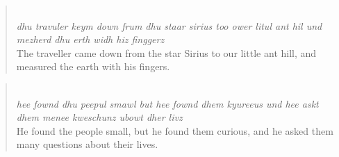 \begin{quote}\noindent {}\\[1pt]
\textit{dhu travuler keym down frum dhu staar sirius too ower litul ant hil und mezherd dhu erth widh hiz finggerz}\\[1pt]
The traveller came down from the star Sirius to our little ant hill, and measured the earth with his fingers.
\end{quote}
\begin{quote}\noindent {}\\[1pt]
\textit{hee fownd dhu peepul smawl but hee fownd dhem kyureeus und hee askt dhem menee kweschunz ubowt dher livz}\\[1pt]
He found the people small, but he found them curious, and he asked them many questions about their lives.
\end{quote}